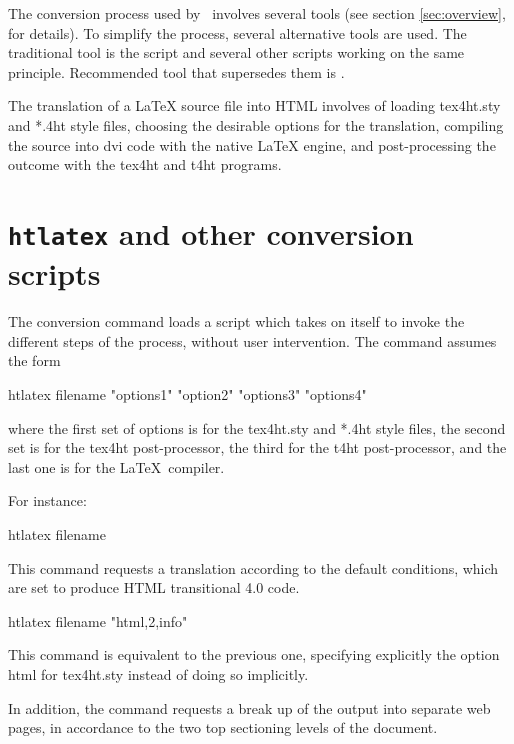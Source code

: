 The conversion process used by \texfourht\ involves several tools
(see section \ref{sec:overview},  for details). To
simplify the process, several alternative tools are used. The traditional tool
is the  script and several other scripts working on the same
principle. Recommended tool that supersedes them is .


The translation of a LaTeX source file into HTML involves of loading tex4ht.sty
and *.4ht style files, choosing the desirable options for the translation,
compiling the source into dvi code with the native LaTeX engine, and
post-processing the outcome with the tex4ht and t4ht programs.

\section{\texttt{htlatex} and other conversion scripts}

The conversion command loads a script which takes on itself to invoke the
different steps of the process, without user intervention. The command assumes
the form

\begin{shellcommand}
htlatex filename "options1" "option2" "options3" "options4"
\end{shellcommand}

where the first set of options is for the tex4ht.sty and *.4ht style files, the
second set is for the tex4ht post-processor, the third for the t4ht
post-processor, and the last one is for the \LaTeX\ compiler. 


For instance:

\begin{shellcommand}
htlatex filename
\end{shellcommand}

This command requests a translation according to the default conditions, which are set to produce HTML transitional 4.0 code. 

\begin{shellcommand}
htlatex filename "html,2,info"
\end{shellcommand}

This command is equivalent to the previous one, specifying explicitly the option html for tex4ht.sty instead of doing so implicitly.

In addition, the command requests a break up of the output into separate web pages, in accordance to the two top sectioning levels of the document.

